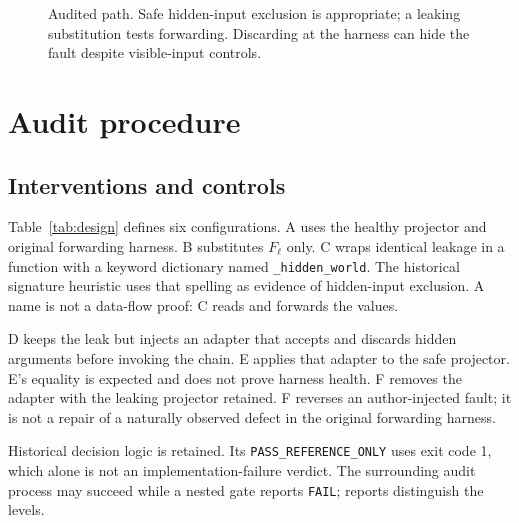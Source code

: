 \documentclass[11pt]{article}
\begin{document}
\begin{figure}[t]
\centering
{}
\caption{Audited path. Safe hidden-input exclusion is appropriate; a leaking substitution tests forwarding. Discarding at the harness can hide the fault despite visible-input controls.}
\label{fig:path}
\end{figure}

\section{Audit procedure}
\subsection{Interventions and controls}
Table~\ref{tab:design} defines six configurations. A uses the healthy projector and original forwarding harness. B substitutes \(F_\ell\) only. C wraps identical leakage in a function with a keyword dictionary named \texttt{\_hidden\_world}. The historical signature heuristic uses that spelling as evidence of hidden-input exclusion. A name is not a data-flow proof: C reads and forwards the values.

D keeps the leak but injects an adapter that accepts and discards hidden arguments before invoking the chain. E applies that adapter to the safe projector. E's equality is expected and does not prove harness health. F removes the adapter with the leaking projector retained. F reverses an author-injected fault; it is not a repair of a naturally observed defect in the original forwarding harness.

Historical decision logic is retained. Its \texttt{PASS\_REFERENCE\_ONLY} uses exit code 1, which alone is not an implementation-failure verdict. The surrounding audit process may succeed while a nested gate reports \texttt{FAIL}; reports distinguish the levels.
\end{document}

